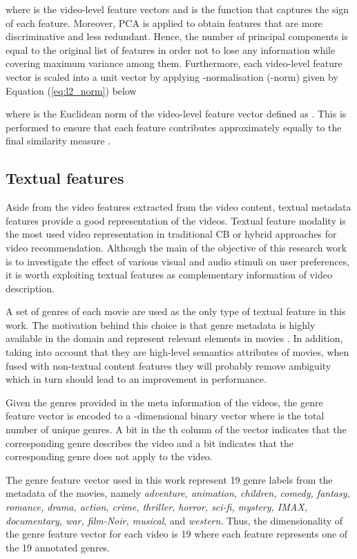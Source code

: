 \documentclass[review]{elsarticle}
\begin{document}
\noindent where  is the video-level feature vectors and  is the function that captures the sign of each feature. Moreover, \ac{PCA} is applied to obtain features that are more discriminative and less redundant. Hence, the number of principal components is equal to the original list of features in order not to lose any information while covering maximum variance among them. Furthermore, each video-level feature vector is scaled into a unit vector by applying -normalisation (-norm) given by Equation (\ref{eq:l2_norm}) below  



\noindent where  is the Euclidean norm of the video-level feature vector defined as . This is performed to ensure that each feature contributes approximately equally to the final similarity measure \citep{ranjan2017l2}. 

\subsection{Textual features}
Aside from the video features extracted from the video content, textual metadata features provide a good representation of the videos. Textual feature modality is the most used video representation in traditional \ac{CB} or hybrid approaches for video recommendation. Although the main of the objective of this research work is to investigate the effect of various visual and audio stimuli on user preferences, it is worth exploiting textual features as complementary information of video description. 

A set of genres of each movie are used as the only type of textual feature in this work. The motivation behind this choice is that genre metadata is highly available in the domain and represent relevant elements in movies \citep{deldjoo2019movie}. In addition, taking into account that they are high-level semantics attributes of movies, when fused with non-textual content features they will probably remove ambiguity which in turn should lead to an improvement in performance. 

Given the genres provided in the meta information of the videos, the genre feature vector is encoded to a -dimensional binary vector where  is the total number of unique genres. A bit  in the th column of the vector indicates that the corresponding genre describes the video and a bit  indicates that the corresponding genre does not apply to the video. 

The genre feature vector used in this work represent 19 genre labels from the metadata of the movies, namely \textit{adventure, animation, children, comedy, fantasy, romance, drama, action, crime, thriller, horror, sci-fi, mystery, IMAX, documentary, war, film-Noir, musical}, and \textit{western}. Thus, the dimensionality of the genre feature vector for each video is 19 where each feature represents one of the 19 annotated genres.     
\end{document}
